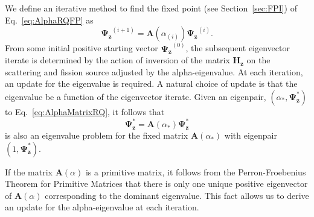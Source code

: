 We define an iterative method to find the fixed point (see Section~\ref{sec:FPI}) of Eq.~\ref{eq:AlphaRQFP} as
\begin{equation}
	\mathbf{\Psi_{z}}^{(i+1)} = \mathbf{A}(\alpha_{(i)}) \mathbf{\Psi_{z}}^{(i)}.
\end{equation}
From some initial positive starting vector $\mathbf{\Psi_{z}}^{(0)}$, the subsequent eigenvector iterate is determined by the action of inversion of the matrix $\mathbf{H_{z}}$ on the scattering and fission source adjusted by the alpha-eigenvalue. At each iteration, an update for the eigenvalue is required. A natural choice of update is that the eigenvalue be a function of the eigenvector iterate. Given an eigenpair, $(\alpha_{*}, \mathbf{\Psi_{z}^{*}})$ to Eq.~\ref{eq:AlphaMatrixRQ}, it follows that
\begin{equation}
	\mathbf{\Psi_{z}^{*}} =  \mathbf{A}(\alpha_{*}) \mathbf{\Psi_{z}^{*}}
\end{equation}
is also an eigenvalue problem for the fixed matrix $\mathbf{A}(\alpha_{*})$ with eigenpair $(1,\mathbf{\Psi}_{\mathbf{z}}^{*})$.

If the matrix $\mathbf{A}(\alpha)$ is a primitive matrix, it follows from the Perron-Froebenius Theorem for Primitive Matrices that there is only one unique positive eigenvector of $\mathbf{A}(\alpha)$ corresponding to the dominant eigenvalue. This fact allows us to derive an update for the alpha-eigenvalue at each iteration.

